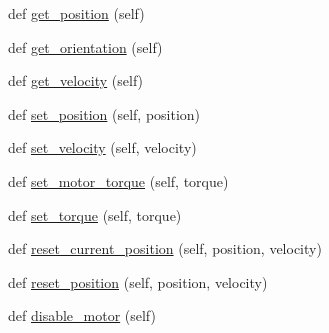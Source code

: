 \begin{DoxyCompactItemize}
def \hyperlink{classpybullet-gym_1_1pybulletgym_1_1envs_1_1mujoco_1_1robots_1_1robot__bases_1_1_joint_a0a88a699cb1e5c15af3d14bb9cd595e8}{get\+\_\+position} (self)
\item 
def \hyperlink{classpybullet-gym_1_1pybulletgym_1_1envs_1_1mujoco_1_1robots_1_1robot__bases_1_1_joint_aa185914d9b44af5feb68a80e36567859}{get\+\_\+orientation} (self)
\item 
def \hyperlink{classpybullet-gym_1_1pybulletgym_1_1envs_1_1mujoco_1_1robots_1_1robot__bases_1_1_joint_ac6ccae41a4ba849aec0f3ec140b37a4d}{get\+\_\+velocity} (self)
\item 
def \hyperlink{classpybullet-gym_1_1pybulletgym_1_1envs_1_1mujoco_1_1robots_1_1robot__bases_1_1_joint_a354a467409eb34efb6d5c8fc6a4a7bdd}{set\+\_\+position} (self, position)
\item 
def \hyperlink{classpybullet-gym_1_1pybulletgym_1_1envs_1_1mujoco_1_1robots_1_1robot__bases_1_1_joint_a0fefa6af95281181a2b657e966d470a8}{set\+\_\+velocity} (self, velocity)
\item 
def \hyperlink{classpybullet-gym_1_1pybulletgym_1_1envs_1_1mujoco_1_1robots_1_1robot__bases_1_1_joint_a90a2b600483b6df2a298f502d8edb104}{set\+\_\+motor\+\_\+torque} (self, torque)
\item 
def \hyperlink{classpybullet-gym_1_1pybulletgym_1_1envs_1_1mujoco_1_1robots_1_1robot__bases_1_1_joint_aa61c8bd24ae09d6a52d8e645b080ea62}{set\+\_\+torque} (self, torque)
\item 
def \hyperlink{classpybullet-gym_1_1pybulletgym_1_1envs_1_1mujoco_1_1robots_1_1robot__bases_1_1_joint_a025df897fb8f3ecfc1f241d2d4a2fd57}{reset\+\_\+current\+\_\+position} (self, position, velocity)
\item 
def \hyperlink{classpybullet-gym_1_1pybulletgym_1_1envs_1_1mujoco_1_1robots_1_1robot__bases_1_1_joint_a030394293dc0c1d5ae8b145f8af95c41}{reset\+\_\+position} (self, position, velocity)
\item 
def \hyperlink{classpybullet-gym_1_1pybulletgym_1_1envs_1_1mujoco_1_1robots_1_1robot__bases_1_1_joint_a8a4221bdc1d8bab08515bf56ace4886b}{disable\+\_\+motor} (self)
\end{DoxyCompactItemize}
